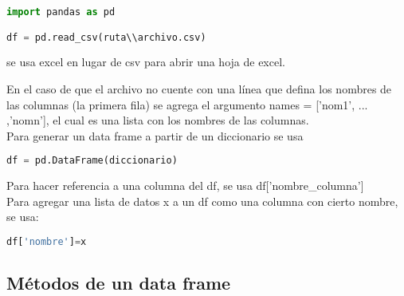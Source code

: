 \documentclass[10pt,oneside]{article}
\begin{document}
\begin{multicols}{2}
                \begin{lstlisting}[language=Python]
import pandas as pd

df = pd.read_csv(ruta\\archivo.csv) 
                \end{lstlisting}

                se usa excel en lugar de csv para abrir una hoja de excel. \\ \newline

                En el caso de que el archivo no cuente con una línea que defina los nombres de las columnas (la primera fila) se agrega el argumento names = ['nom1', ... ,'nomn'], el cual es una lista con los nombres de las columnas.\\ \newline Para generar un data frame a partir de un diccionario se usa 
                
                \begin{lstlisting}[language=Python]
df = pd.DataFrame(diccionario)
                \end{lstlisting}
                
                Para hacer referencia a una columna del df, se usa df['nombre\_columna']\\ \newline Para agregar una lista de datos x a un df como una columna con cierto nombre, se usa:

                \begin{lstlisting}[language=Python]
df['nombre']=x
                \end{lstlisting}
                
                \subsection{Métodos de un data frame}


\end{multicols}
\end{document}
